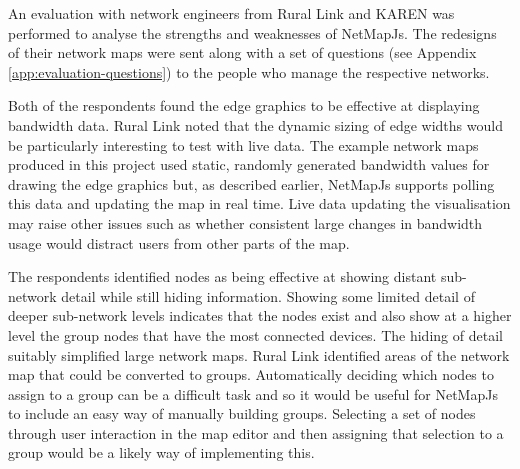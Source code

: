 \documentclass[11pt, a4paper]{report}
\begin{document}
An evaluation with network engineers from Rural Link and KAREN was performed to
analyse the strengths and weaknesses of NetMapJs. The redesigns of their network
maps were sent along with a set of questions (see Appendix
\ref{app:evaluation-questions}) to the people who manage the respective
networks.

%


Both of the respondents found the edge graphics to be effective at displaying
bandwidth data. Rural Link noted that the dynamic sizing of edge widths would be
particularly interesting to test with live data. The example network maps
produced in this project used static, randomly generated bandwidth values for
drawing the edge graphics but, as described earlier, NetMapJs supports polling
this data and updating the map in real time. Live data updating the
visualisation may raise other issues such as whether consistent large changes in
bandwidth usage would distract users from other parts of the map. 

The respondents identified nodes as being effective at showing distant sub-network
detail while still hiding information. Showing some limited detail of deeper
sub-network levels indicates that the nodes exist and also show at a higher
level the group nodes that have the most connected devices. The hiding of detail
suitably simplified large network maps. Rural Link identified areas of the
network map that could be converted to groups. Automatically deciding which
nodes to assign to a group can be a difficult task and so it would be useful for
NetMapJs to include an easy way of manually building groups. Selecting a set of
nodes through user interaction in the map editor and then assigning that
selection to a group would be a likely way of implementing this.
\end{document}

